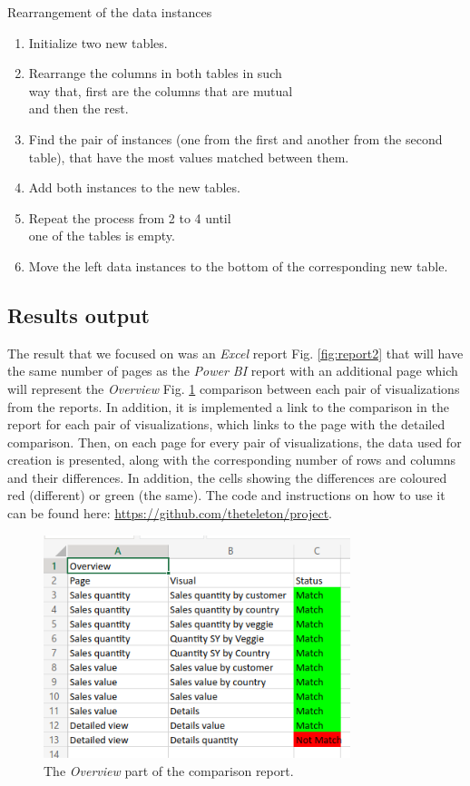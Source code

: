 \documentclass[fleqn,moreauthors,10pt]{ds_report}
\begin{document}
\begin{algorithm}
\caption{\hypertarget{algo2}{Rearrangement of the data instances}}
\begin{enumerate}
    \item Initialize two new tables.
    \item Rearrange the columns in both tables in such \\way that, first are the columns that are mutual \\and then the rest.
    \item Find the pair of instances (one from the first and another from the second table), that have the most values matched between them.
    \item Add both instances to the new tables.
    \item Repeat the process from 2 to 4 until \\one of the tables is empty.
    \item  Move the left data instances to the bottom of the corresponding new table.
\end{enumerate}

\end{algorithm}

\subsection*{Results output}
 The result that we focused on was an \textit{Excel} report Fig. \ref{fig:report2} that will have the same number of pages as the \textit{Power BI} report with an additional page which will represent the \textit{Overview} Fig. \ref{fig:overall} comparison between each pair of visualizations from the reports. In addition, it is implemented a link to the comparison in the report for each pair of visualizations, which links to the page with the detailed comparison. Then, on each page for every pair of visualizations, the data used for creation is presented, along with the corresponding number of rows and columns and their differences. In addition, the cells showing the differences are coloured red (different) or green (the same). The code and instructions on how to use it can be found here: \url{https://github.com/theteleton/project}.

\begin{figure}
    \centering
    \includegraphics[width=\linewidth, height=6.5cm]{fig/overview.png}
    \caption{The \textit{Overview} part of the comparison report.}
    \label{fig:overall}
\end{figure}
\end{document}
